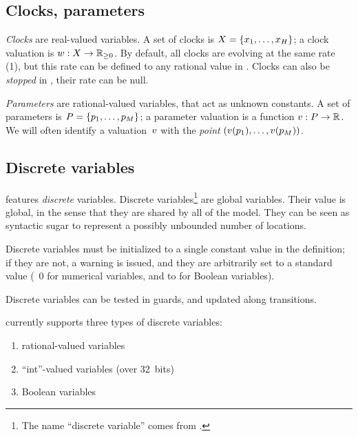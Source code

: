 \subsection{Clocks, parameters}

\emph{Clocks} are real-valued variables.
A set of clocks is $X = \{ x_1, \dots, x_H \}$;
a clock valuation is
$w : X \rightarrow \mathbb R_{\geq 0}$.
By default, all clocks are evolving at the same rate (1), but this rate can be defined to any rational value in \imitator{}.
Clocks can also be \emph{stopped} in \imitator{}, \ie{} their rate can be null.

\emph{Parameters} are rational-valued variables, that act as unknown constants.
A set of parameters is $P = \{ p_1, \dots, p_M \} $;
a parameter valuation is a function $v : P \rightarrow \mathbb R$.
We will often identify a valuation~$v$ with the \emph{point} $(v(p_1), \dots, v(p_{M}))$.


\subsection{Discrete variables}\label{section:discrete}

\imitator{} features \emph{discrete} variables.
%
Discrete variables\footnote{%
	The name ``discrete variable'' comes from \hytech{}.
}
are global variables.
Their value is global, in the sense that they are shared by all \IPTA{} of the model.
They can be seen as syntactic sugar to represent a possibly unbounded number of locations.


Discrete variables must be initialized to a single constant value in the  definition;
if they are not, a warning is issued, and they are arbitrarily set to a standard value (\eg{}~0 for numerical variables, and to \BFalse{} for Boolean variables).

Discrete variables can be tested in guards, and updated along transitions.

\imitator{} currently supports three types of discrete variables:
\begin{enumerate}
	\item rational-valued variables
	\item ``int''-valued variables (over 32~bits)
	\item Boolean variables
\end{enumerate}

